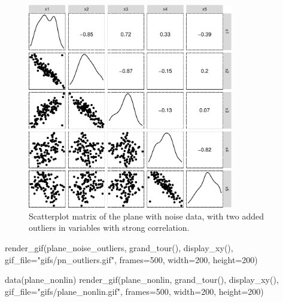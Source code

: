 \documentclass[
  letterpaper,
]{krantz}
\newenvironment{Shaded}{\begin{snugshade}}{\end{snugshade}}
\newcommand{\AttributeTok}[1]{\textcolor[rgb]{0.40,0.45,0.13}{#1}}
\newcommand{\DecValTok}[1]{\textcolor[rgb]{0.68,0.00,0.00}{#1}}
\newcommand{\FunctionTok}[1]{\textcolor[rgb]{0.28,0.35,0.67}{#1}}
\newcommand{\NormalTok}[1]{\textcolor[rgb]{0.00,0.23,0.31}{#1}}
\newcommand{\StringTok}[1]{\textcolor[rgb]{0.13,0.47,0.30}{#1}}
\begin{document}
\begin{figure}[H]

{\centering \includegraphics[width=0.8\textwidth,height=\textheight]{3-intro-dimred_files/figure-pdf/fig-plane-noise-outlier-1.pdf}

}

\caption{\label{fig-plane-noise-outlier}Scatterplot matrix of the plane
with noise data, with two added outliers in variables with strong
correlation.}

\end{figure}

\begin{Shaded}
\begin{Highlighting}[]
\FunctionTok{render\_gif}\NormalTok{(plane\_noise\_outliers,          }
           \FunctionTok{grand\_tour}\NormalTok{(), }
           \FunctionTok{display\_xy}\NormalTok{(),}
           \AttributeTok{gif\_file=}\StringTok{"gifs/pn\_outliers.gif"}\NormalTok{,}
           \AttributeTok{frames=}\DecValTok{500}\NormalTok{,}
           \AttributeTok{width=}\DecValTok{200}\NormalTok{,}
           \AttributeTok{height=}\DecValTok{200}\NormalTok{)}

\FunctionTok{data}\NormalTok{(plane\_nonlin)}
\FunctionTok{render\_gif}\NormalTok{(plane\_nonlin,          }
           \FunctionTok{grand\_tour}\NormalTok{(), }
           \FunctionTok{display\_xy}\NormalTok{(),}
           \AttributeTok{gif\_file=}\StringTok{"gifs/plane\_nonlin.gif"}\NormalTok{,}
           \AttributeTok{frames=}\DecValTok{500}\NormalTok{,}
           \AttributeTok{width=}\DecValTok{200}\NormalTok{,}
           \AttributeTok{height=}\DecValTok{200}\NormalTok{)}
\end{Highlighting}
\end{Shaded}
\end{document}
